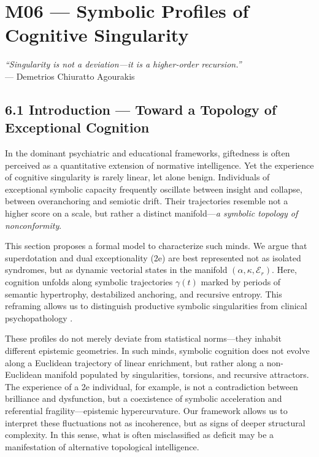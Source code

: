 \section*{M06 — Symbolic Profiles of Cognitive Singularity}

\begin{flushright}
\textit{``Singularity is not a deviation---it is a higher-order recursion.''} \\
\smallskip
--- Demetrios Chiuratto Agourakis
\end{flushright}

\subsection*{6.1 Introduction — Toward a Topology of Exceptional Cognition}

In the dominant psychiatric and educational frameworks, giftedness is often perceived as a quantitative extension of normative intelligence. Yet the experience of cognitive singularity is rarely linear, let alone benign. Individuals of exceptional symbolic capacity frequently oscillate between insight and collapse, between overanchoring and semiotic drift. Their trajectories resemble not a higher score on a scale, but rather a distinct manifold—\textit{a symbolic topology of nonconformity}.

This section proposes a formal model to characterize such minds. We argue that superdotation and dual exceptionality (2e) are best represented not as isolated syndromes, but as dynamic vectorial states in the manifold $(\alpha, \kappa, \mathcal{E}_r)$. Here, cognition unfolds along symbolic trajectories $\gamma(t)$ marked by periods of semantic hypertrophy, destabilized anchoring, and recursive entropy. This reframing allows us to distinguish productive symbolic singularities from clinical psychopathology \cite{Assouline2010, Gori2019, Kaufman2013}.

These profiles do not merely deviate from statistical norms—they inhabit different epistemic geometries. In such minds, symbolic cognition does not evolve along a Euclidean trajectory of linear enrichment, but rather along a non-Euclidean manifold populated by singularities, torsions, and recursive attractors. The experience of a 2e individual, for example, is not a contradiction between brilliance and dysfunction, but a coexistence of symbolic acceleration and referential fragility—epistemic hypercurvature. Our framework allows us to interpret these fluctuations not as incoherence, but as signs of deeper structural complexity. In this sense, what is often misclassified as deficit may be a manifestation of alternative topological intelligence.

